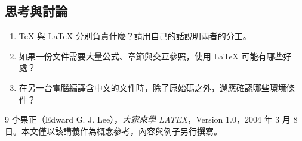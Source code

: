 \subsection*{思考與討論}

\begin{enumerate}
    \item TeX 與 LaTeX 分別負責什麼？請用自己的話說明兩者的分工。
    \item 如果一份文件需要大量公式、章節與交互參照，使用 LaTeX 可能有哪些好處？
    \item 在另一台電腦編譯含中文的文件時，除了原始碼之外，還應確認哪些環境條件？
\end{enumerate}

\begin{thebibliography}{9}
李果正（Edward G. J. Lee），\textit{大家來學 LATEX}，Version 1.0，2004 年 3 月 8 日。本文僅以該講義作為概念參考，內容與例子另行撰寫。
\end{thebibliography}